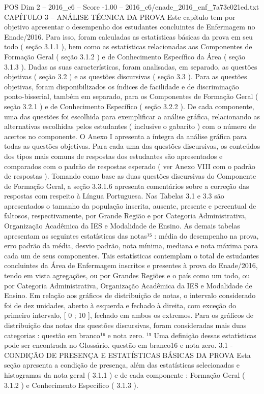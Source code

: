 \begin{textsample}{POS Dim 2 – 2016\_c6 – Score -1.00 – 2016\_c6/enade\_2016\_enf\_7a73e021ed.txt}  \label{ex:f2_pos_213}
CAPÍTULO 3 – ANÁLISE TÉCNICA DA PROVA Este capítulo tem por objetivo apresentar o desempenho dos estudantes concluintes de Enfermagem no Enade/2016.
Para isso, foram calculadas as estatísticas básicas da prova em seu todo ( seção 3.1.1 ), bem como as estatísticas relacionadas aos Componentes de Formação Geral ( seção 3.1.2 ) e de Conhecimento Específico da Área ( seção 3.1.3 ).
Dadas as suas características, foram analisadas, em separado, as questões objetivas ( seção 3.2 ) e as questões discursivas ( seção 3.3 ).
Para as questões objetivas, foram disponibilizados os índices de facilidade e de discriminação ponto-bisserial, também em separado, para os Componentes de Formação Geral ( seção 3.2.1 ) e de Conhecimento Específico ( seção 3.2.2 ).
De cada componente, uma das questões foi escolhida para exemplificar a análise gráfica, relacionando as alternativas escolhidas pelos estudantes ( inclusive o gabarito ) com o número de acertos no componente.
O Anexo I apresenta a íntegra da análise gráfica para todas as questões objetivas.
Para cada uma das questões discursivas, os conteúdos dos tipos mais comuns de respostas dos estudantes são apresentados e comparados com o padrão de respostas esperado ( ver Anexo VIII com o padrão de respostas ).
Tomando como base as duas questões discursivas do Componente de Formação Geral, a seção 3.3.1.6 apresenta comentários sobre a correção das respostas com respeito à Língua Portuguesa.
Nas Tabelas 3.1 e 3.3 são apresentados o tamanho da população inscrita, ausente, presente e percentual de faltosos, respectivamente, por Grande Região e por Categoria Administrativa, Organização Acadêmica da IES e Modalidade de Ensino.
As demais tabelas apresentam as seguintes estatísticas das notas¹⁵ : média do desempenho na prova, erro padrão da média, desvio padrão, nota mínima, mediana e nota máxima para cada um de seus componentes.
Tais estatísticas contemplam o total de estudantes concluintes da Área de Enfermagem inscritos e presentes à prova do Enade/2016, tendo em vista agregações, ou por Grandes Regiões e o país como um todo, ou por Categoria Administrativa, Organização Acadêmica da IES e Modalidade de Ensino.
Em relação aos gráficos de distribuição de notas, o intervalo considerado foi de dez unidades, aberto à esquerda e fechado à direita, com exceção do primeiro intervalo, [ 0 ; 10 ], fechado em ambos os extremos.
Para os gráficos de distribuição das notas das questões discursivas, foram consideradas mais duas categorias : questão em branco¹⁶ e nota zero. ¹⁵ Uma definição dessas estatísticas pode ser encontrada no Glossário. questão em branco16 e nota zero. 3.1 - CONDIÇÃO DE PRESENÇA E ESTATÍSTICAS BÁSICAS DA PROVA Esta seção apresenta a condição de presença, além das estatísticas selecionadas e histogramas da nota geral ( 3.1.1 ) e de cada componente : Formação Geral ( 3.1.2 ) e Conhecimento Específico ( 3.1.3 ).

\end{textsample}
